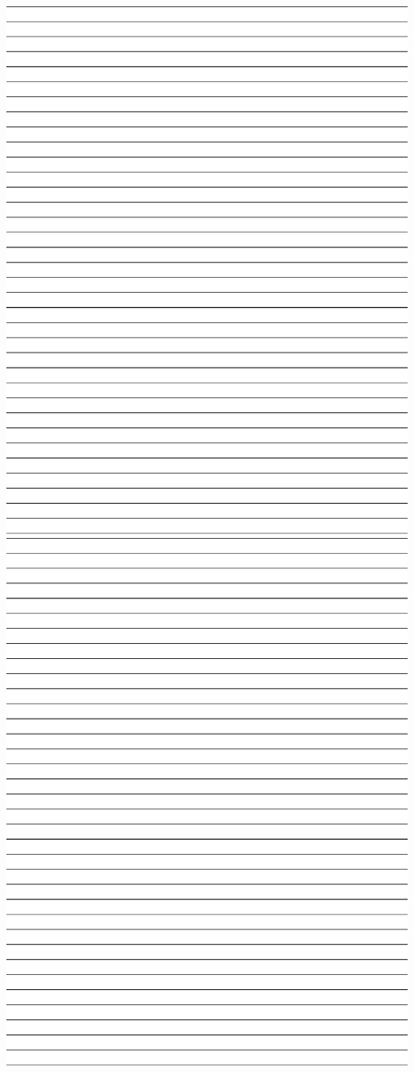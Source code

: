 \includegraphics[width=7.5in]{graphics/notepaper.eps}
\includegraphics[width=7.5in]{graphics/notepaper.eps}

